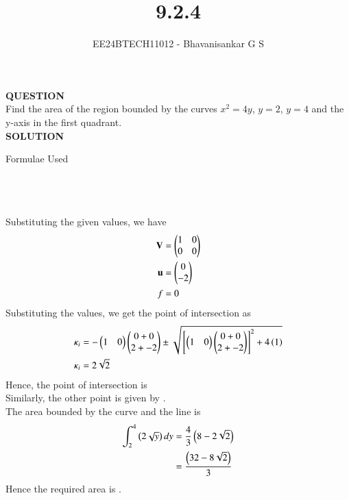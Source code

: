\documentclass[journal]{IEEEtran}
\begin{document}

\vspace{3cm}

\title{9.2.4}
\author{EE24BTECH11012 - Bhavanisankar G S}
{\let\newpage\relax\maketitle}

\renewcommand{\thefigure}{\theenumi}
\renewcommand{\thetable}{\theenumi}
\setlength{\intextsep}{10pt} %


\renewcommand{\thetable}{\theenumi}

\textbf{QUESTION} \\
Find the area of the region bounded by the curves $ x^2 = 4y $, $ y=2$, $y=4$ and the y-axis in the first quadrant. \\
\textbf{SOLUTION} \\

\begin{table}[h!]
	\centering
        
	\caption{Formulae Used}
	\label{tab9.2.4}
\end{table} \\ \\ \\
Substituting the given values, we have \\
\begin{align}
	\mathbf{V} &= \begin{pmatrix} 1 & 0 \\ 0 & 0 \end{pmatrix} \\
	\mathbf{u} &= \begin{pmatrix} 0 \\ -2 \end{pmatrix} \\
	f &= 0 \\
\end{align}
Substituting the values, we get the point of intersection as \\
\begin{align}
	\kappa_i &= -\begin{pmatrix}1&0\end{pmatrix}\begin{pmatrix}0 + 0 \\ 2 + -2\end{pmatrix} \pm \sqrt{{}\left[\begin{pmatrix}1&0\end{pmatrix}\begin{pmatrix}0+0\\ 2+-2\end{pmatrix} \right]^2 + 4\left(1\right)} \\
	\kappa_i &= 2\sqrt{2} \\
\end{align}
Hence, the point of intersection is  \\
Similarly, the other point is given by  .\\
The area bounded by the curve and the line is \\
\begin{align}
	\int_{2}^{4} \left(2\sqrt{y}\right) dy &= \frac{4}{3}\left(8-2\sqrt{2}\right) \\
	&= \frac{\left(32 - 8\sqrt{2}\right)}{3} \\
\end{align}
Hence the required area is  .
	
\end{document}
